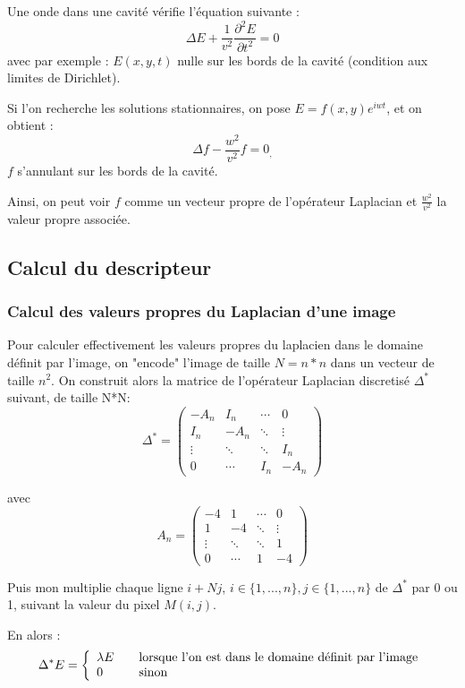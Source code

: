 \documentclass[a4paper,10pt]{article} %
\theoremstyle{definition} %
\begin{document}
Une onde dans une cavité vérifie l'équation suivante : $$\Delta E + \frac{1}{v^2} \frac{\partial^2 E}{\partial t^2} = 0$$ avec par exemple : $E(x,y,t)$ nulle sur les bords de la cavité (condition aux limites de Dirichlet).

Si l'on recherche les solutions stationnaires, on pose $E = f(x,y)e^{iwt}$, et on obtient : 
$$ \Delta f  - \frac{w^2}{v^2} f  = 0 _, $$$f$ s'annulant sur les bords de la cavité.

Ainsi, on peut voir $f$ comme un vecteur propre de l'opérateur Laplacian et $\frac{w^2}{v^2}$ la valeur propre associée.

\subsection*{Calcul du descripteur}

\subsubsection*{Calcul des valeurs propres du Laplacian d'une image}

Pour calculer effectivement les valeurs propres du laplacien dans le domaine définit par l'image, on "encode" l'image de taille $N = n*n$ dans un vecteur de taille $n^2$.
On construit alors la matrice de l'opérateur Laplacian discretisé $\Delta^*$ suivant, de taille N*N: 
$$
\Delta^* =
 \begin{pmatrix}
  -A_n & I_n & \cdots & 0 \\
  I_n & -A_n & \ddots &   \vdots \\
  \vdots  & \ddots  & \ddots & I_n  \\
  0 & \cdots  & I_n & -A_n
 \end{pmatrix}
$$

avec $$A_n =  
\begin{pmatrix}
  -4 & 1 & \cdots & 0 \\
  1  & -4 & \ddots &   \vdots \\
  \vdots  & \ddots  & \ddots & 1  \\
  0 & \cdots  & 1 & -4
 \end{pmatrix}  $$

Puis mon multiplie chaque ligne $i+Nj$, $i \in \{1, ..., n\}, j \in \{1, ..., n\}$ de $\Delta^*$ par 0 ou 1, suivant la valeur du pixel $M(i,j)$.

En alors : 
\[ \Delta^* E = \left\{ 
  \begin{array}{l l}
    \lambda E & \quad \text{lorsque l'on est dans le domaine définit par l'image}\\
    0 & \quad \text{sinon}
  \end{array} \right.\]
  
\end{document}
